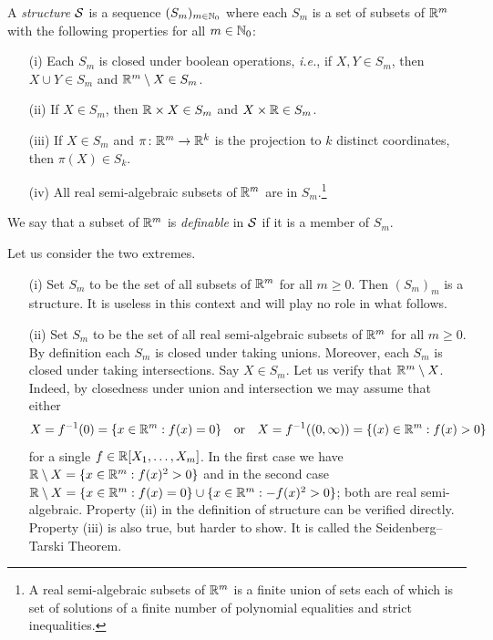 \begin{definition}
  \label{def:structure}
  A \emph{structure} ${\mathcal S}$ is a sequence $(S_m)_{m\in{\mathbb{N}}_0}$
  where each $S_m$ is a set of subsets of ${\mathbb{R}}^m$ with the following
  properties for all $m\in {\mathbb{N}}_0$:
  \begin{enumerate}
  \item [(i)] Each $S_m$ is closed under boolean operations,
    \textit{i.e.}, if $X,Y\in S_m$, then $X\cup Y\in S_m$ and
    ${\mathbb{R}}^m\setminus X\in S_m$.
  \item[(ii)] If $X\in S_m$, then ${\mathbb{R}}\times X\in S_m$ and $X\times
    {\mathbb{R}}\in S_m$.
  \item[(iii)] If $X\in S_{m}$ and $\pi\colon
    {\mathbb{R}}^{m}\rightarrow{\mathbb{R}}^k$ is the projection to $k$ distinct
    coordinates, then 
    $\pi(X)\in S_k$.
  \item[(iv)] All real semi-algebraic subsets of ${\mathbb{R}}^m$ are in
    $S_m$.\footnote{A real semi-algebraic subsets of ${\mathbb{R}}^m$ is a
      finite union of sets each of which is set of 
      solutions of a finite number of polynomial equalities and
      strict inequalities.}    
  \end{enumerate}
  We say that a subset of  ${\mathbb{R}}^m$ is \emph{definable} in ${\mathcal S}$ if it
  is a member of $S_m$.
\end{definition}

\begin{example} Let us consider the two extremes.
  \begin{enumerate}
  \item [(i)] Set $S_m$ to be the set of all subsets of ${\mathbb{R}}^m$ for
    all $m\ge 0$. Then $(S_m)_m$ is a structure. It is useless in this
    context and will play no role
    in what follows.
  \item[(ii)]
    Set $S_m$ to be the set of all real semi-algebraic subsets of ${\mathbb{R}}^m$
    for all $m\ge 0$. By definition each $S_m$ is closed under taking
    unions. Moreover, each $S_m$ is closed under taking intersections.    
    Say $X\in S_m$. Let us  verify that ${\mathbb{R}}^m \setminus X$. Indeed, by
    closedness under union and intersection we may assume that either 
    \begin{equation*}
      X = f^{-1}(0)=\{ x\in{\mathbb{R}}^m : f(x) = 0\}
      \quad\text{or}\quad       X = f^{-1}((0,\infty))=\{ (x)\in{\mathbb{R}}^m : f(x) > 0\}
    \end{equation*}
    for a single $f\in{\mathbb{R}}[X_1,\ldots,X_m]$. In the first case
    we have ${\mathbb{R}}\setminus X=\{x\in{\mathbb{R}}^m : f(x)^2 > 0\}$ and in the second
    case
    ${\mathbb{R}}\setminus X = \{x\in{\mathbb{R}}^m : f(x)=0\} \cup \{x\in {\mathbb{R}}^m: -f(x)^2 >
    0\}$; both are real semi-algebraic.
    Property (ii) in the definition of structure can be verified
    directly. Property (iii) is also true, but harder to show. It
    is called the Seidenberg--Tarski Theorem.
  \end{enumerate}
\end{example}



